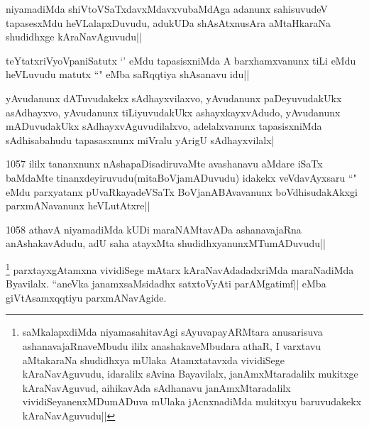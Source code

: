 
\begin{artha}
niyamadiMda shiVtoVSaTxdavxMdavxvubaMdAga adanunx sahisuvudeV tapasesxMdu heVLalapxDuvudu, adukUDa shAsAtxnusAra aMtaHkaraNa shudidhxge kAraNavAguvudu||
\end{artha}

\begin{artha}
teYtatxriVyoVpaniSatutx `\stext' eMdu tapasisxniMda A barxhamxvanunx tiLi eMdu heVLuvudu matutx ``\stext" eMba saRqqtiya shAsanavu idu||
\end{artha}


\begin{artha}
yAvudanunx dATuvudakekx sAdhayxvilaxvo, yAvudanunx paDeyuvudakUkx asAdhayxvo, yAvudanunx tiLiyuvudakUkx ashayxkayxvAdudo, yAvudanunx mADuvudakUkx sAdhayxvAguvudilalxvo, adelalxvanunx tapasisxniMda sAdhisabahudu tapasasxnunx miVralu yArigU sAdhayxvilalx|
\end{artha}


\begin{artha}
1057 ililx tananxnunx nAshapaDisadiruvaMte avashanavu aMdare iSaTx baMdaMte tinanxdeyiruvudu(mitaBoVjamADuvudu) idakekx veVdavAyxsaru ``\stext" eMdu parxyatanx pUvaRkayadeVSaTx BoVjanABAvavanunx boVdhisudakAkxgi parxmANavanunx heVLutAtxre||
\end{artha}

\begin{artha}
1058 athavA niyamadiMda kUDi maraNAMtavADa ashanavajaRna anAshakavAdudu, adU saha atayxMta shudidhxyanunxMTumADuvudu||
\end{artha}

\begin{artha}
\footnote{saMkalapxdiMda niyamasahitavAgi sAyuvapayARMtara anusarisuva ashanavajaRnaveMbudu ililx anashakaveMbudara athaR, I varxtavu aMtakaraNa shudidhxya mUlaka Atamxtatavxda vividiSege kAraNavAguvudu, idaralilx sAvina Bayavilalx, janAmxMtaradalilx mukitxge kAraNavAguvud, aihikavAda sAdhanavu janAmxMtaradalilx vividiSeyanenxMDumADuva mUlaka jAcnxnadiMda mukitxyu baruvudakekx kAraNavAguvudu||} parxtayxgAtamxna vividiSege mAtarx kAraNavAdadadxriMda maraNadiMda Byavilalx. ``aneVka janamxsaMsidadhx satxtoVyAti parAMgatimf|| eMba giVtAsamxqqtiyu parxmANavAgide.
\end{artha}


